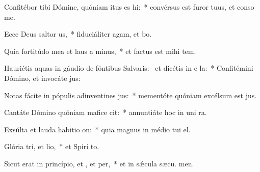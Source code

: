 \item Confitébor tibi Dómine, quóniam itus es hi:~* convérsus est furor tuus, et conso  me.
\item Ecce Deus saltor us,~* fiduciáliter agam, et  bo.
\item Quia fortitúdo mea et laus a minus,~* et factus est mihi  tem.
\item Hauriétis aquas in gáudio de fóntibus Salvaris:~\pscross{} et dicétis in e la:~* Confitémini Dómino, et invocáte  jus:
\item Notas fácite in pópulis adinventines jus:~* mementóte quóniam excélsum est  jus.
\item Cantáte Dómino quóniam mafice cit:~* annuntiáte hoc in uni ra.
\item Exsúlta et lauda habitio on:~* quia magnus in médio tui  el.
\item Glória tri, et lio,~* et Spirí to.
\item Sicut erat in princípio, et , et per,~* et in sǽcula sæcu. men.
